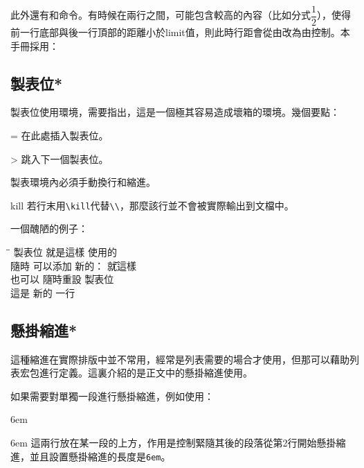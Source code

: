 此外還有和命令。有時候在兩行之間，可能包含較高的內容（比如分式$\dfrac{1}{2}$），使得前一行底部與後一行頂部的距離小於limit值，則此時行距會從由改為由控制。本手冊採用：
\begin{latex}
\setlength{\lineskiplimit}{3pt}
\setlength{\lineskip}{3pt}
\end{latex}

\subsection{製表位*}
製表位使用環境，需要指出，這是一個極其容易造成壞箱的環境。幾個要點：
\begin{para}
\item[\char92{}=] 在此處插入製表位。
\item[\char92{}>] 跳入下一個製表位。
\item[\char92{}\char92{}] 製表環境內必須手動換行和縮進。
\item[\char92{}kill] 若行末用\verb|\kill|代替\verb|\\|，那麼該行並不會被實際輸出到文檔中。
\end{para}

一個醜陋的例子：
\begin{codeshow}
\begin{tabbing}
\hspace{4em}\=\hspace{8em}\=\kill
製表位 \> 就是這樣 \> 使用的 \\
隨時 \> 可以添加 \> 新的： \= 就這樣 \\
也可以 \= 隨時重設 \= 製表位 \\
這是 \> 新的 \> 一行
\end{tabbing}
\end{codeshow}

\subsection{懸掛縮進*}
這種縮進在實際排版中並不常用，經常是列表需要的場合才使用，但那可以藉助列表宏包進行定義。這裏介紹的是正文中的懸掛縮進使用。

如果需要對單獨一段進行懸掛縮進，例如使用：
\begin{latex}
\hangindent 6em
\end{latex}

\hangindent 6em
這兩行放在某一段的上方，作用是控制緊隨其後的段落從第2行開始懸掛縮進，並且設置懸掛縮進的長度是\texttt{6em}。

